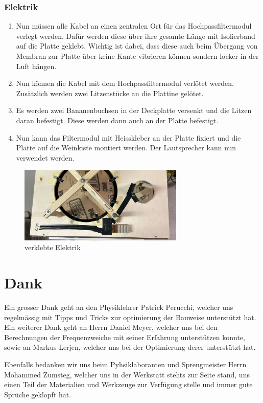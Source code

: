 \documentclass[a4paper,11pt]{report}
\begin{document}
\newpage
\subsection{Elektrik}
\begin{enumerate}
    \item Nun müssen alle Kabel an einen zentralen Ort für das Hochpassfiltermodul verlegt werden. Dafür werden diese über ihre gesamte Länge mit Isolierband auf die Platte geklebt. Wichtig ist dabei, dass diese auch beim Übergang von Membran zur Platte über keine Kante vibrieren können sondern locker in der Luft hängen.
    \item Nun können die Kabel mit dem Hochpassfiltermodul verlötet werden. Zusätzlich werden zwei Litzenstücke an die Plattine gelötet.
    \item Es werden zwei Bananenbuchsen in der Deckplatte versenkt und die Litzen daran befestigt. Diese werden dann auch an der Platte befestigt. 
    \item Nun kann das Filtermodul mit Heisskleber an der Platte fixiert und die Platte auf die Weinkiste montiert werden. Der Lautsprecher kann nun verwendet werden. 
\end{enumerate}
\begin{figure}[h]
    \centering
    \includegraphics[width=0.7\textwidth]{resources/images/Fotos/Physik-118.jpg}
    \caption{{verklebte Elektrik}}
    \label{fig:glued_elek}
\end{figure}
\chapter*{Dank}
Ein grosser Dank geht an den Physiklehrer Patrick Perucchi, welcher uns regelmässig mit Tipps und Tricks zur optimierung der Bauweise unterstützt hat.
Ein weiterer Dank geht an Herrn Daniel Meyer, welcher uns bei den Berechnungen der Frequenzweiche mit seiner Erfahrung unterstützen konnte, sowie an Markus Lerjen, welcher uns bei der Optimierung derer unterstützt hat.

Ebenfalls bedanken wir uns beim Pyhsiklaboranten und Sprengmeister Herrn Mohammed Zumsteg, welcher uns in der Werkstatt stehts zur Seite stand, uns einen Teil der Materialien und Werkzeuge zur Verfügung stelle und immer gute Sprüche geklopft hat.

\newpage
\listoffigures

\newpage


\end{document}
